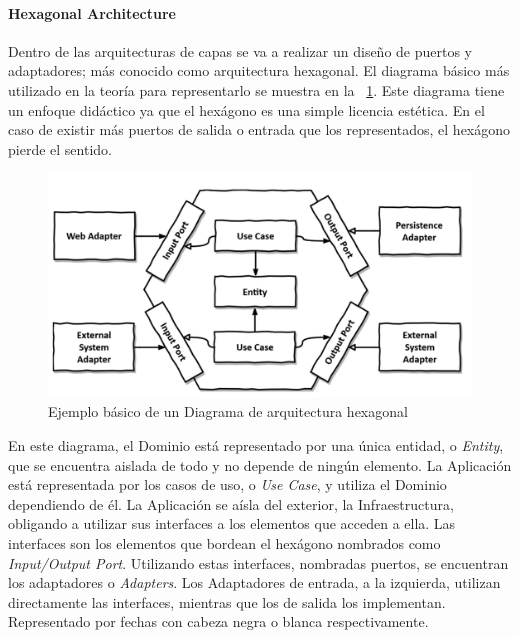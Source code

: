 
\paragraph{Hexagonal Architecture}

Dentro de las arquitecturas de capas se va a realizar un diseño de puertos y adaptadores;
más conocido como arquitectura hexagonal.
El diagrama básico más utilizado en la teoría para representarlo se muestra en la ~\cref{fig:hexagonalDiagram}.
Este diagrama tiene un enfoque didáctico ya que el hexágono es una simple licencia estética.
En el caso de existir más puertos de salida o entrada que los representados, el hexágono pierde el sentido.

\begin{figure}[H]
    \centering
    \includegraphics[height=0.22\textheight]{./part/Ejecucion/Seguimiento/CreateTaskUseCase/img/HexagonalDiagram}
    \caption{Ejemplo básico de un Diagrama de arquitectura hexagonal\cite{TomHombergs2019GYHD}}\label{fig:hexagonalDiagram}
\end{figure}

En este diagrama, el Dominio está representado por una única entidad, o \textit{Entity}, que se encuentra aislada de todo y no depende de ningún elemento.
La Aplicación está representada por los casos de uso, o \textit{Use Case}, y utiliza el Dominio dependiendo de él.
La Aplicación se aísla del exterior, la Infraestructura, obligando a utilizar sus interfaces a los elementos que acceden a ella.
Las interfaces son los elementos que bordean el hexágono nombrados como \textit{Input/Output Port}.
Utilizando estas interfaces, nombradas puertos, se encuentran los adaptadores o \textit{Adapters}.
Los Adaptadores de entrada, a la izquierda, utilizan directamente las interfaces, mientras que los de salida los implementan.
Representado por fechas con cabeza negra o blanca respectivamente.

